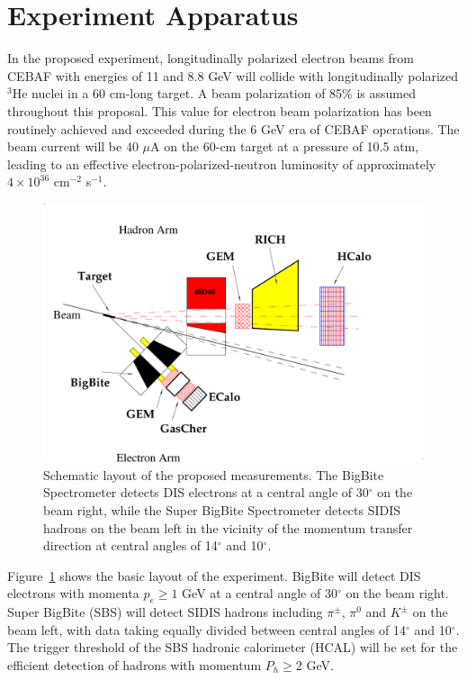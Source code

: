 \section{Experiment Apparatus}

In the proposed experiment, longitudinally polarized electron beams from CEBAF with energies of 11 and 8.8 GeV will collide with longitudinally polarized $^3$He nuclei in a 60 cm-long target. A beam polarization of 85\% is assumed throughout this proposal. This value for electron beam polarization has been routinely achieved and exceeded during the 6 GeV era of CEBAF operations. The beam current will be 40 $\mu$A on the 60-cm target at a pressure of 10.5 atm, leading to an effective electron-polarized-neutron luminosity of approximately $4\times 10^{36}$ cm$^{-2}$ s$^{-1}$. 
\begin{figure}[h]
  \begin{center}
    \includegraphics[width=.75\textwidth]{figures/SIDIS_layout.pdf}
  \end{center}
  \caption{\label{fig:cartoon} Schematic layout of the proposed measurements. The BigBite Spectrometer detects DIS electrons at a central angle of 30$^\circ$ on the beam right, while the Super BigBite Spectrometer detects SIDIS hadrons on the beam left in the vicinity of the momentum transfer direction at central angles of 14$^\circ$ and 10$^\circ$.}
\end{figure}
Figure~\ref{fig:cartoon} shows the basic layout of the experiment. BigBite will detect DIS electrons with momenta $p_e \ge 1$ GeV at a central angle of 30$^\circ$ on the beam right. Super BigBite (SBS) will detect SIDIS hadrons including $\pi^\pm$, $\pi^0$ and $K^\pm$ on the beam left, with data taking equally divided between central angles of 14$^\circ$ and 10$^\circ$. The trigger threshold of the SBS hadronic calorimeter (HCAL) will be set for the efficient detection of hadrons with momentum $P_h \ge 2$ GeV. 

